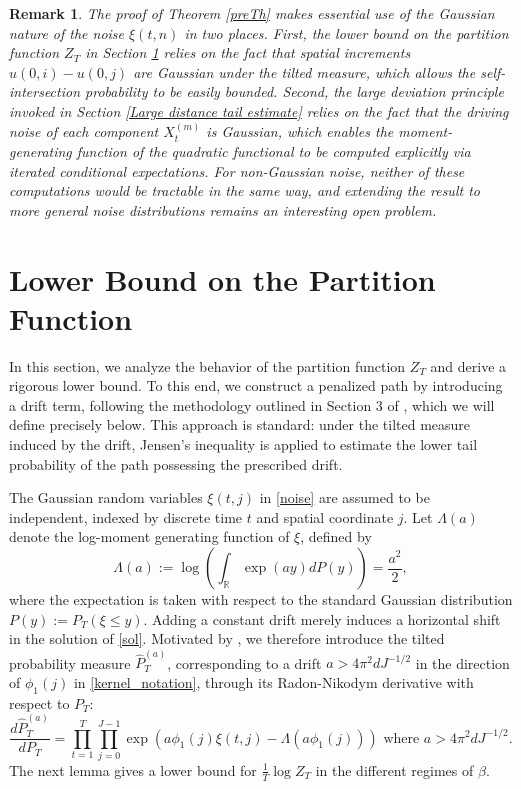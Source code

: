 \documentclass[12pt]{amsart}
\newtheorem{remark}{Remark}[section]
\numberwithin{equation}{section}
\newcommand{\R}{\mathbb{R}}
\newcommand{\1}{\mathbf{1}}
\begin{document}
\begin{remark}
    The proof of Theorem \ref{preTh} makes essential use of the Gaussian nature of the noise $\xi(t,n)$ in two places. First, the lower bound on the partition function $Z_T$ in Section \ref{Lower Bound on the Partition Function} relies on the fact that spatial increments $u(0,i)-u(0,j)$ are Gaussian under the tilted measure, which allows the self-intersection probability to be easily bounded. Second, the large deviation principle invoked in Section \ref{Large distance tail estimate} relies on the fact that the driving noise of each component $X_t^{(m)}$ is Gaussian, which enables the moment-generating function of the quadratic functional to be computed explicitly via iterated conditional expectations. For non-Gaussian noise, neither of these computations would be tractable in the same way, and extending the result to more general noise distributions remains an interesting open problem.
\end{remark}

\section{Lower Bound on the Partition Function}
\label{Lower Bound on the Partition Function}
In this section, we analyze the behavior of the partition function $Z_T$ and derive a rigorous lower bound. To this end, we construct a penalized path by introducing a drift term, following the methodology outlined in Section 3 of \cite{bolthausen1990self}, which we will define precisely below. This approach is standard: under the tilted measure induced by the drift, Jensen's inequality is applied to estimate the lower tail probability of the path possessing the prescribed drift. 

The Gaussian random variables $\xi(t,j)$ in \eqref{noise} are assumed to be independent, indexed by discrete time $t$ and spatial coordinate $j$. Let $\Lambda(a)$ denote the log-moment generating function of $\xi$, defined by
\begin{equation}
\label{logmom}
    \Lambda(a) := \log\left(\int_\R \exp(ay)dP(y)\right)=\frac{a^2}{2},
\end{equation} 
where the expectation is taken with respect to the standard Gaussian distribution $P(y):=P_T(\xi\leq y)$. Adding a constant drift merely induces a horizontal shift in the solution of \eqref{sol}. Motivated by \cite{mueller2022scaling}, we therefore introduce the tilted probability measure $\widehat{P}_T^{(a)}$, corresponding to a drift $a>4\pi^2 d J^{-1/2}$ in the direction of $\phi_1(j)$ in \eqref{kernel_notation}, through its Radon-Nikodym derivative with respect to $P_T$:
\begin{equation}
\label{RN}
    \frac{d\widehat{P}_T^{(a)}}{dP_T}=\prod_{t=1}^T\prod_{j=0}^{J-1}\exp(a\phi_1(j)\xi(t,j)-\Lambda(a\phi_1(j)))\text{ where $a>4\pi^2d J^{-1/2}$}.
\end{equation}
The next lemma gives a lower bound for $\frac{1}{T}\log Z_T$ in the different regimes of $\beta$.
\end{document}
